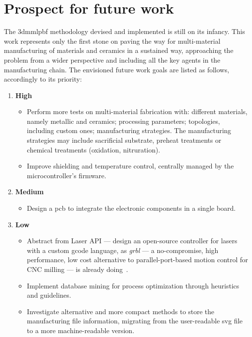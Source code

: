 \section{Prospect for future work}
%
The \gls{3dmmlpbf} methodology devised and implemented is still on its
infancy. This work represents only the first stone on paving the way for
multi-material manufacturing of materials and ceramics in a sustained way,
approaching the problem from a wider perspective and including all the key
agents in the manufacturing chain. The envisioned future work goals are listed as
follows, accordingly to its priority:
\begin{enumerate}
\item \textbf{High}
\begin{itemize}
\item Perform more tests on multi-material fabrication with: different
  materials, namely metallic
  and ceramics; processing
  parameters; topologies, including custom ones; manufacturing strategies.
  The manufacturing strategies may include sacrificial substrate, preheat
  treatments or chemical treatments (oxidation, nitruration).
\item Improve shielding and temperature control, centrally managed by the microcontroller's firmware.
\end{itemize}
%
\item \textbf{Medium}
\begin{itemize}
\item Design a \gls{pcb} to integrate the electronic components in a single board.
\end{itemize}
%
\item \textbf{Low}
\begin{itemize}
\item Abstract from Laser API --- design an open-source controller for
lasers with a custom gcode language, as \emph{grbl} --- a no-compromise, high
performance, low cost alternative to parallel-port-based motion control for CNC
milling --- is already doing~\cite{grbl}.
\item Implement database mining for process optimization through heuristics and
  guidelines.
\item Investigate alternative and more compact methods to store the
  manufacturing file information, migrating from the user-readable \gls{svg}
  file to a more machine-readable version.
\end{itemize}
%
\end{enumerate}
%

